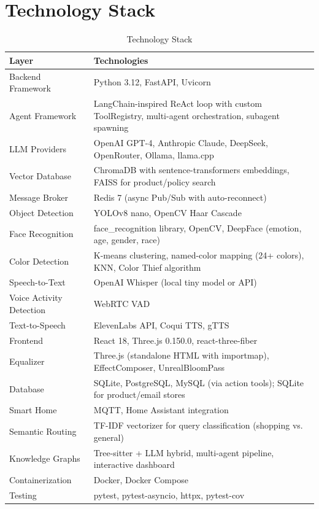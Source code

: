 \documentclass[12pt,a4paper,twoside]{report}
\begin{document}
\section{Technology Stack}

\begin{table}[H]
\centering
\begin{tabularx}{\textwidth}{|l|X|}
\hline
\rowcolor{phiblue!20}
\textbf{Layer} & \textbf{Technologies} \\
\hline
Backend Framework & Python 3.12, FastAPI, Uvicorn \\
\hline
Agent Framework & LangChain-inspired ReAct loop with custom ToolRegistry, multi-agent orchestration, subagent spawning \\
\hline
LLM Providers & OpenAI GPT-4, Anthropic Claude, DeepSeek, OpenRouter, Ollama, llama.cpp \\
\hline
Vector Database & ChromaDB with sentence-transformers embeddings, FAISS for product/policy search \\
\hline
Message Broker & Redis 7 (async Pub/Sub with auto-reconnect) \\
\hline
Object Detection & YOLOv8 nano, OpenCV Haar Cascade \\
\hline
Face Recognition & face\_recognition library, OpenCV, DeepFace (emotion, age, gender, race) \\
\hline
Color Detection & K-means clustering, named-color mapping (24+ colors), KNN, Color Thief algorithm \\
\hline
Speech-to-Text & OpenAI Whisper (local tiny model or API) \\
\hline
Voice Activity Detection & WebRTC VAD \\
\hline
Text-to-Speech & ElevenLabs API, Coqui TTS, gTTS \\
\hline
Frontend & React 18, Three.js 0.150.0, react-three-fiber \\
\hline
Equalizer & Three.js (standalone HTML with importmap), EffectComposer, UnrealBloomPass \\
\hline
Database & SQLite, PostgreSQL, MySQL (via action tools); SQLite for product/email stores \\
\hline
Smart Home & MQTT, Home Assistant integration \\
\hline
Semantic Routing & TF-IDF vectorizer for query classification (shopping vs. general) \\
\hline
Knowledge Graphs & Tree-sitter + LLM hybrid, multi-agent pipeline, interactive dashboard \\
\hline
Containerization & Docker, Docker Compose \\
\hline
Testing & pytest, pytest-asyncio, httpx, pytest-cov \\
\hline
\end{tabularx}
\caption{Technology Stack}
\end{table}
\end{document}
